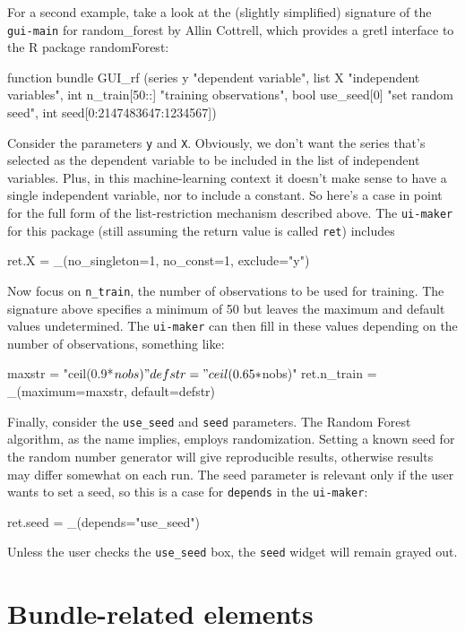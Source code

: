 \documentclass[oneside]{book}
\begin{document}
For a second example, take a look at the (slightly simplified)
signature of the \texttt{gui-main} for \textsf{random\_forest} by
Allin Cottrell, which provides a gretl interface to the \textsf{R}
package \textsf{randomForest}:
\begin{code}
function bundle GUI_rf (series y "dependent variable",
   list X "independent variables",
   int n_train[50::] "training observations",
   bool use_seed[0] "set random seed",
   int seed[0:2147483647:1234567])
\end{code}

Consider the parameters \texttt{y} and \texttt{X}. Obviously, we don't
want the series that's selected as the dependent variable to be
included in the list of independent variables. Plus, in this
machine-learning context it doesn't make sense to have a single
independent variable, nor to include a constant. So here's a case in
point for the full form of the list-restriction mechanism described
above.  The \texttt{ui-maker} for this package (still assuming the
return value is called \texttt{ret}) includes
\begin{code}
ret.X = _(no_singleton=1, no_const=1, exclude="y")
\end{code}

Now focus on \texttt{n\_train}, the number of observations to be used
for training. The signature above specifies a minimum of 50 but leaves
the maximum and default values undetermined. The \texttt{ui-maker} can
then fill in these values depending on the number of observations,
something like:
\begin{code}
maxstr = "ceil(0.9*$nobs)"
defstr = "ceil(0.65*$nobs)"
ret.n_train = _(maximum=maxstr, default=defstr)
\end{code}

Finally, consider the \texttt{use\_seed} and \texttt{seed}
parameters. The Random Forest algorithm, as the name implies, employs
randomization. Setting a known seed for the random number generator
will give reproducible results, otherwise results may differ somewhat
on each run. The seed parameter is relevant only if the user wants to
set a seed, so this is a case for \texttt{depends} in the
\texttt{ui-maker}:
\begin{code}
ret.seed = _(depends="use_seed")
\end{code}
Unless the user checks the \texttt{use\_seed} box, the \texttt{seed}
widget will remain grayed out.

\section{Bundle-related elements}
\label{sec:spec-bundle}
\end{document}
